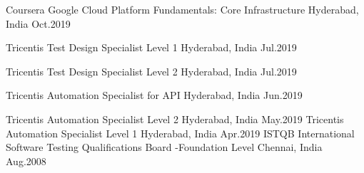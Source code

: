 
\begin{cvhonors}

  \cvhonor
	{Coursera} %
    {Google Cloud Platform Fundamentals: Core Infrastructure} %
    {Hyderabad, India} %
    {Oct.2019} %

  \cvhonor
    {Tricentis} %
    {Test Design Specialist Level 1} %
    {Hyderabad, India} %
    {Jul.2019} %

  \cvhonor
    {Tricentis} %
    {Test Design Specialist Level 2} %
    {Hyderabad, India} %
    {Jul.2019} %

  \cvhonor
    {Tricentis} %
    {Automation Specialist for API} %
    {Hyderabad, India} %
    {Jun.2019} %

  \cvhonor
    {Tricentis} %
    {Automation Specialist Level 2} %
    {Hyderabad, India} %
    {May.2019} %
  \cvhonor
    {Tricentis} %
    {Automation Specialist Level 1} %
    {Hyderabad, India} %
    {Apr.2019} %
  \cvhonor
    {ISTQB} %
    {International Software Testing Qualifications Board -Foundation Level} %
    {Chennai, India} %
    {Aug.2008} %

\end{cvhonors}
